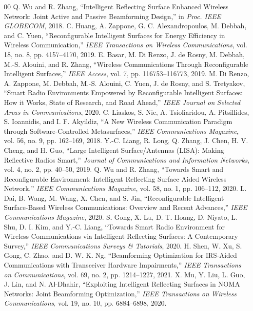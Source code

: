 \documentclass[journal]{IEEEtran}
\begin{document}
\begin{thebibliography}{00}
 Q. Wu and R. Zhang, ``Intelligent Reflecting Surface Enhanced Wireless Network: Joint Active and Passive Beamforming Design,'' in \emph{Proc. IEEE GLOBECOM}, 2018.
 C. Huang, A. Zappone, G. C. Alexandropoulos, M. Debbah, and C. Yuen, ``Reconfigurable Intelligent Surfaces for Energy Efficiency in Wireless Communication,'' \emph{IEEE Transactions on Wireless Communications}, vol. 18, no. 8, pp. 4157--4170, 2019.
 E. Basar, M. Di Renzo, J. de Rosny, M. Debbah, M.-S. Alouini, and R. Zhang, ``Wireless Communications Through Reconfigurable Intelligent Surfaces,'' \emph{IEEE Access}, vol. 7, pp. 116753--116773, 2019.
 M. Di Renzo, A. Zappone, M. Debbah, M.-S. Alouini, C. Yuen, J. de Rosny, and S. Tretyakov, ``Smart Radio Environments Empowered by Reconfigurable Intelligent Surfaces: How it Works, State of Research, and Road Ahead,'' \emph{IEEE Journal on Selected Areas in Communications}, 2020.
 C. Liaskos, S. Nie, A. Tsioliaridou, A. Pitsillides, S. Ioannidis, and I. F. Akyildiz, ``A New Wireless Communication Paradigm through Software-Controlled Metasurfaces,'' \emph{IEEE Communications Magazine}, vol. 56, no. 9, pp. 162--169, 2018.
 Y.-C. Liang, R. Long, Q. Zhang, J. Chen, H. V. Cheng, and H. Guo, ``Large Intelligent Surface/Antennas (LISA): Making Reflective Radios Smart,'' \emph{Journal of Communications and Information Networks}, vol. 4, no. 2, pp. 40--50, 2019.
 Q. Wu and R. Zhang, ``Towards Smart and Reconfigurable Environment: Intelligent Reflecting Surface Aided Wireless Network,'' \emph{IEEE Communications Magazine}, vol. 58, no. 1, pp. 106--112, 2020.
 L. Dai, B. Wang, M. Wang, X. Chen, and S. Jin, ``Reconfigurable Intelligent Surface-Based Wireless Communications: Overview and Recent Advances,'' \emph{IEEE Communications Magazine}, 2020.
 S. Gong, X. Lu, D. T. Hoang, D. Niyato, L. Shu, D. I. Kim, and Y.-C. Liang, ``Towards Smart Radio Environment for Wireless Communications via Intelligent Reflecting Surfaces: A Contemporary Survey,'' \emph{IEEE Communications Surveys \& Tutorials}, 2020.
 H. Shen, W. Xu, S. Gong, C. Zhao, and D. W. K. Ng, ``Beamforming Optimization for IRS-Aided Communications with Transceiver Hardware Impairments,'' \emph{IEEE Transactions on Communications}, vol. 69, no. 2, pp. 1214--1227, 2021.
 X. Mu, Y. Liu, L. Guo, J. Lin, and N. Al-Dhahir, ``Exploiting Intelligent Reflecting Surfaces in NOMA Networks: Joint Beamforming Optimization,'' \emph{IEEE Transactions on Wireless Communications}, vol. 19, no. 10, pp. 6884--6898, 2020.

\end{thebibliography}
\end{document}
